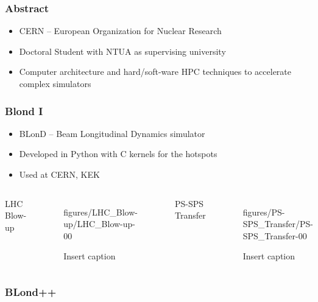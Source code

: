 

\begin{frame}
	\frametitle{Abstract}
	\begin{itemize}
		\item CERN -- European Organization for Nuclear Research
		\item Doctoral Student with NTUA as supervising university
		\item Computer architecture and hard/soft-ware HPC techniques to 
		accelerate complex simulators
	\end{itemize}
\end{frame}


\begin{frame}
	\frametitle{Blond I}
	\begin{itemize}
		\item BLonD -- Beam Longitudinal Dynamics simulator
		\item Developed in Python with C kernels for the hotspots
		\item Used at CERN, KEK
	\end{itemize}
\end{frame}

\begin{frame}
		\begin{columns}[t]
			\centering
			LHC Blow-up\\
			\begin{figure}[h]
				\hspace{-12pt}
				 {figures/LHC_Blow-up/LHC_Blow-up-}{0}{0} %
				\caption*{Insert caption}
			\end{figure}
			
			\centering
			PS-SPS Transfer\\
			\begin{figure}[h]
				 {figures/PS-SPS_Transfer/PS-SPS_Transfer-}{0}{0} %
				\caption*{Insert caption}
			\end{figure}
		\end{columns}
\end{frame}


\begin{frame}
	\frametitle{BLond++}
\end{frame}

